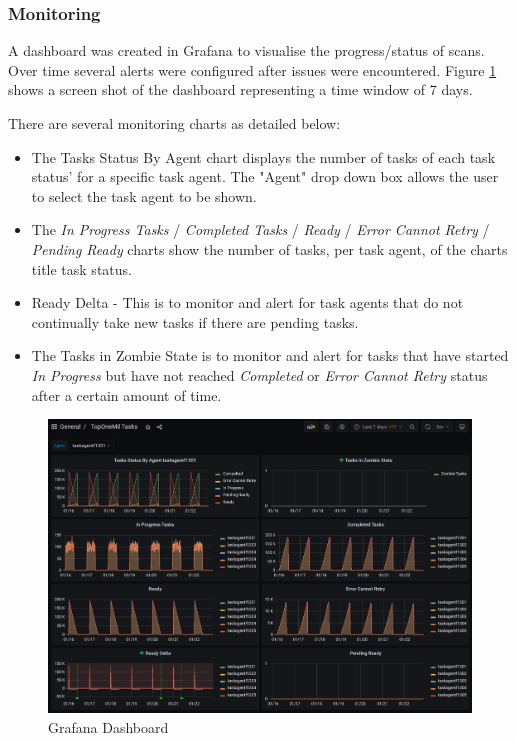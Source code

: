 \documentclass{mscreport}
\begin{document}
\subsubsection{Monitoring}

A dashboard was created in Grafana to visualise the progress/status of scans. Over time several alerts were configured after issues were encountered. Figure \ref{fig:grafana_screenshot} shows a screen shot of the dashboard representing a time window of 7 days.

\newpage

\vspace{0.3cm} \noindent
There are several monitoring charts as detailed below:
\begin{itemize}
	\setlength\itemsep{0.1em}
    \item The Tasks Status By Agent chart displays the number of tasks of each task status' for a specific task agent. The "Agent" drop down box allows the user to select the task agent to be shown.
    \item The \textit{In Progress Tasks} / \textit{Completed Tasks} / \textit{Ready} / \textit{Error Cannot Retry} / \textit{Pending Ready} charts show the number of tasks, per task agent, of the charts title task status.
    \item Ready Delta - This is to monitor and alert for task agents that do not continually take new tasks if there are pending tasks.
    \item The Tasks in Zombie State is to monitor and alert for tasks that have started \textit{In Progress} but have not reached \textit{Completed} or \textit{Error Cannot Retry} status after a certain amount of time.
\end{itemize}



\begin{figure}[ht]
	\begin{center}
		\includegraphics[scale=0.48]{../images/Grafana.png} 
		\caption{Grafana Dashboard}
		\label{fig:grafana_screenshot}
	\end{center}
\end{figure}
\end{document}
